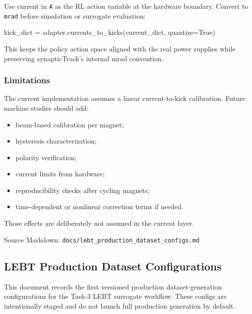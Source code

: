 \documentclass[
]{article}
\newenvironment{Shaded}{}{}
\newcommand{\NormalTok}[1]{#1}
\newcommand{\OperatorTok}[1]{\textcolor[rgb]{0.40,0.40,0.40}{#1}}
\newcommand{\VariableTok}[1]{\textcolor[rgb]{0.10,0.09,0.49}{#1}}
\providecommand{\tightlist}{%
  \setlength{\itemsep}{0pt}\setlength{\parskip}{0pt}}
\begin{document}
Use current in \texttt{A} as the RL action variable at the hardware
boundary. Convert to \texttt{mrad} before simulation or surrogate
evaluation:

\begin{Shaded}
\begin{Highlighting}[]
\NormalTok{kick\_dict }\OperatorTok{=}\NormalTok{ adapter.currents\_to\_kicks(current\_dict, quantize}\OperatorTok{=}\VariableTok{True}\NormalTok{)}
\end{Highlighting}
\end{Shaded}

This keeps the policy action space aligned with the real power supplies
while preserving synapticTrack's internal mrad convention.

\hypertarget{limitations}{%
\subsubsection{Limitations}\label{limitations}}

The current implementation assumes a linear current-to-kick calibration.
Future machine studies should add:

\begin{itemize}
\tightlist
\item
  beam-based calibration per magnet;
\item
  hysteresis characterization;
\item
  polarity verification;
\item
  current limits from hardware;
\item
  reproducibility checks after cycling magnets;
\item
  time-dependent or nonlinear correction terms if needed.
\end{itemize}

Those effects are deliberately not assumed in the current layer.

Source Markdown: \texttt{docs/lebt\_production\_dataset\_configs.md}

\hypertarget{lebt-production-dataset-configurations}{%
\subsection{LEBT Production Dataset
Configurations}\label{lebt-production-dataset-configurations}}

This document records the first versioned production dataset-generation
configurations for the Task-3 LEBT surrogate workflow. These configs are
intentionally staged and do not launch full production generation by
default.
\end{document}
